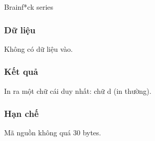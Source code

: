 

       Brainf*ck series     

\subsubsection{   Dữ liệu  }

   Không có dữ liệu vào.  

\subsubsection{   Kết quả  }

   In ra một chữ cái duy nhất: chữ d (in thường).  

\subsubsection{   Hạn chế  }

   Mã nguồn không quá 30 bytes.  
